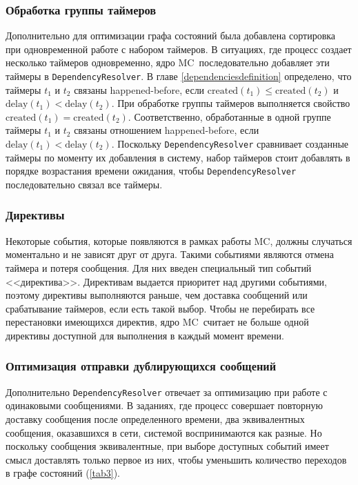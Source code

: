 \documentclass[a4paper,12pt]{extarticle}
\newcommand{\mc}[0]{MC}
\begin{document}
\subsubsection{Обработка группы таймеров}

Дополнительно для оптимизации графа состояний была добавлена сортировка при одновременной работе с набором таймеров.
В ситуациях, где процесс создает несколько таймеров одновременно, ядро \mc\ последовательно добавляет эти таймеры в \texttt{DependencyResolver}.
В главе \ref{dependenciesdefinition} определено, что таймеры $t_1$ и $t_2$ связаны happened-before, если $\text{created}(t_1) \le \text{created}(t_2)$ и $\text{delay}(t_1) < \text{delay}(t_2)$.
При обработке группы таймеров выполняется свойство $\text{created}(t_1) = \text{created}(t_2)$.
Соответственно, обработанные в одной группе таймеры $t_1$ и $t_2$ связаны отношением happened-before, если $\text{delay}(t_1) < \text{delay}(t_2)$.
Поскольку \texttt{DependencyResolver} сравнивает созданные таймеры по моменту их добавления в систему, набор таймеров стоит добавлять в порядке возрастания времени ожидания, чтобы \texttt{DependencyResolver} последовательно связал все таймеры.


\subsubsection{Директивы}

Некоторые события, которые появляются в рамках работы \mc, должны случаться моментально и не зависят друг от друга.
Такими событиями являются отмена таймера и потеря сообщения.
Для них введен специальный тип событий <<директива>>.
Директивам выдается приоритет над другими событиями, поэтому директивы выполняются раньше, чем доставка сообщений или срабатывание таймеров, если есть такой выбор.
Чтобы не перебирать все перестановки имеющихся директив, ядро \mc\ считает не больше одной директивы доступной для выполнения в каждый момент времени.

\subsubsection{Оптимизация отправки дублирующихся сообщений}
\label{equalmessages}

Дополнительно \texttt{DependencyResolver} отвечает за оптимизацию при работе с одинаковыми сообщениями.
В заданиях, где процесс совершает повторную доставку сообщения после определенного времени, два эквивалентных сообщения, оказавшихся в сети, системой воспринимаются как разные.
Но поскольку сообщения эквивалентные, при выборе доступных событий имеет смысл доставлять только первое из них, чтобы уменьшить количество переходов в графе состояний (\cref{tab3}).
\end{document}

